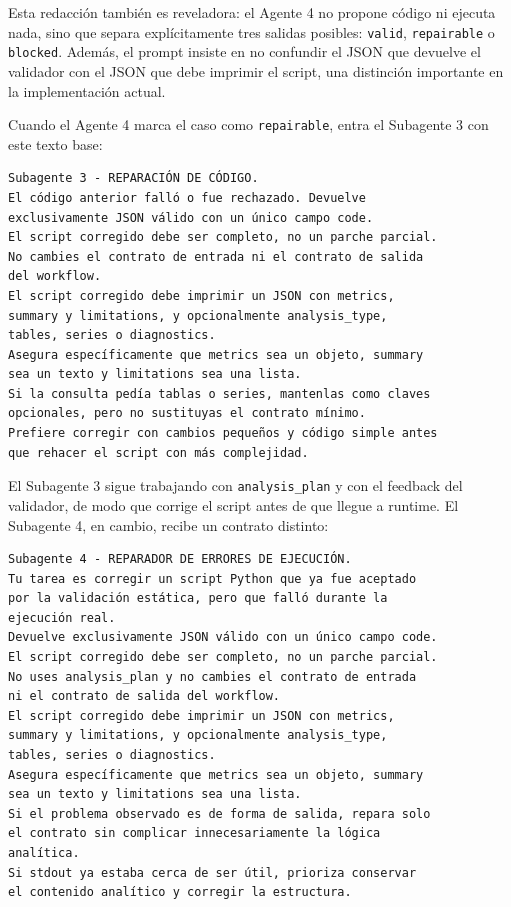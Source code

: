 Esta redacci\'on tambi\'en es reveladora: el Agente 4 no propone c\'odigo ni ejecuta nada, sino que separa expl\'icitamente tres salidas posibles:
\texttt{valid}, \texttt{repairable} o \texttt{blocked}. Adem\'as, el prompt insiste en no confundir el JSON que devuelve el validador con el JSON que debe
imprimir el script, una distinci\'on importante en la implementaci\'on actual.

Cuando el Agente 4 marca el caso como \texttt{repairable}, entra el Subagente 3 con este texto base:

\begin{lstlisting}[style=promptblock]
Subagente 3 - REPARACIÓN DE CÓDIGO.
El código anterior falló o fue rechazado. Devuelve
exclusivamente JSON válido con un único campo code.
El script corregido debe ser completo, no un parche parcial.
No cambies el contrato de entrada ni el contrato de salida
del workflow.
El script corregido debe imprimir un JSON con metrics,
summary y limitations, y opcionalmente analysis_type,
tables, series o diagnostics.
Asegura específicamente que metrics sea un objeto, summary
sea un texto y limitations sea una lista.
Si la consulta pedía tablas o series, mantenlas como claves
opcionales, pero no sustituyas el contrato mínimo.
Prefiere corregir con cambios pequeños y código simple antes
que rehacer el script con más complejidad.
\end{lstlisting}

El Subagente 3 sigue trabajando con \texttt{analysis\_plan} y con el feedback
del validador, de modo que corrige el script antes de que llegue a runtime. El
Subagente 4, en cambio, recibe un contrato distinto:

\begin{lstlisting}[style=promptblock]
Subagente 4 - REPARADOR DE ERRORES DE EJECUCIÓN.
Tu tarea es corregir un script Python que ya fue aceptado
por la validación estática, pero que falló durante la
ejecución real.
Devuelve exclusivamente JSON válido con un único campo code.
El script corregido debe ser completo, no un parche parcial.
No uses analysis_plan y no cambies el contrato de entrada
ni el contrato de salida del workflow.
El script corregido debe imprimir un JSON con metrics,
summary y limitations, y opcionalmente analysis_type,
tables, series o diagnostics.
Asegura específicamente que metrics sea un objeto, summary
sea un texto y limitations sea una lista.
Si el problema observado es de forma de salida, repara solo
el contrato sin complicar innecesariamente la lógica
analítica.
Si stdout ya estaba cerca de ser útil, prioriza conservar
el contenido analítico y corregir la estructura.
\end{lstlisting}

